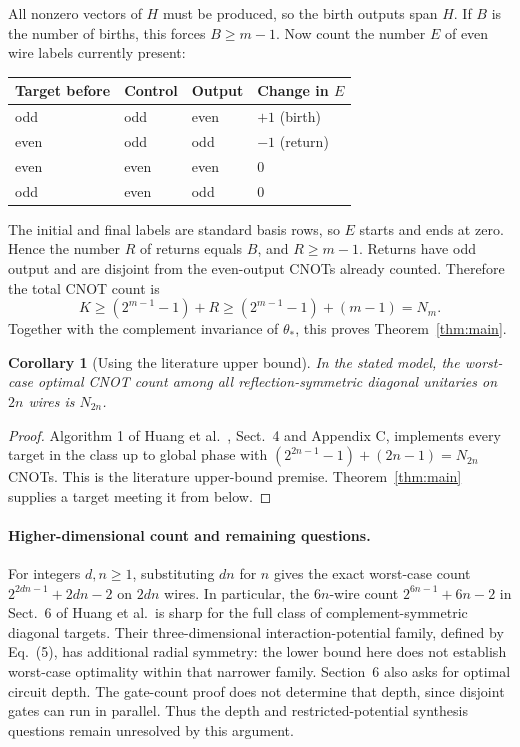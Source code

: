 \documentclass[11pt]{article}
\newtheorem{corollary}{Corollary}
\begin{document}
All nonzero vectors of $H$ must be produced, so the birth outputs span
$H$. If $B$ is the number of births, this forces $B\geq m-1$.
Now count the number $E$ of even wire labels currently present:
\begin{center}
\begin{tabular}{llll}
\toprule
Target before & Control & Output & Change in $E$\\
\midrule
odd & odd & even & $+1$ (birth)\\
even & odd & odd & $-1$ (return)\\
even & even & even & $0$\\
odd & even & odd & $0$\\
\bottomrule
\end{tabular}
\end{center}
The initial and final labels are standard basis rows, so $E$ starts
and ends at zero. Hence the number $R$ of returns equals $B$, and
$R\geq m-1$. Returns have odd output and are disjoint from the
even-output CNOTs already counted. Therefore the total CNOT count is
\[
 K\geq (2^{m-1}-1)+R\geq(2^{m-1}-1)+(m-1)=N_m.
\]
Together with the complement invariance of $\theta_*$, this proves
Theorem~\ref{thm:main}.

\begin{corollary}[Using the literature upper bound]
In the stated model, the worst-case optimal CNOT count among all
reflection-symmetric diagonal unitaries on $2n$ wires is $N_{2n}$.
\end{corollary}
\begin{proof}
Algorithm 1 of Huang et al.~\cite{HKNM}, Sect.~4 and Appendix C,
implements every target in the class up to global phase with
$(2^{2n-1}-1)+(2n-1)=N_{2n}$ CNOTs. This is the literature upper-bound
premise. Theorem~\ref{thm:main} supplies a target meeting it from below.
\end{proof}

\paragraph{Higher-dimensional count and remaining questions.}
For integers $d,n\geq1$, substituting $dn$ for $n$ gives the exact
worst-case count $2^{2dn-1}+2dn-2$ on $2dn$ wires. In particular,
the $6n$-wire count $2^{6n-1}+6n-2$ in Sect.~6 of Huang et al.\ is
sharp for the full class of complement-symmetric diagonal targets.
Their three-dimensional interaction-potential family, defined by
Eq.~(5), has additional radial symmetry: the lower bound here does
not establish worst-case optimality within that narrower family.
Section~6 also asks for optimal circuit depth. The gate-count proof
does not determine that depth, since disjoint gates can run in parallel.
Thus the depth and restricted-potential synthesis questions remain
unresolved by this argument.
\end{document}
